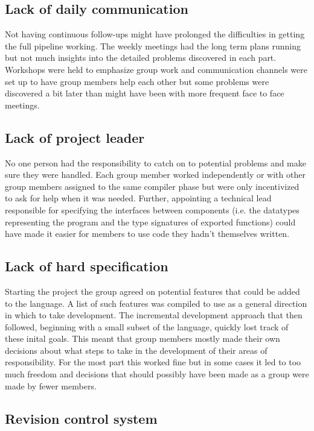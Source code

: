 \subsection{Lack of daily communication}

Not having continuous follow-ups might have prolonged the difficulties in getting the full pipeline working. The weekly meetings had the long term plans running but not much insights into the detailed problems discovered in each part. Workshops were held to emphasize group work and communication channels were set up to have group members help each other but some problems were discovered a bit later than might have been with more frequent face to face meetings.

\subsection{Lack of project leader}

No one person had the responsibility to catch on to potential problems and make sure they were handled. Each group member worked independently or with other group members assigned to the same compiler phase but were only incentivized to ask for help when it was needed. Further, appointing a technical lead responsible for specifying the interfaces between components (i.e. the datatypes representing the program and the type signatures of exported functions) could have made it easier for members to use code they hadn’t themselves written.

\subsection{Lack of hard specification}

Starting the project the group agreed on potential features that could be added to the language. A list of such features was compiled to use as a general direction in which to take development. The incremental development approach that then followed, beginning with a small subset of the language, quickly lost track of these inital goals. This meant that group members mostly made their own decisions about what steps to take in the development of their areas of responsibility. For the most part this worked fine but in some cases it led to too much freedom and decisions that should possibly have been made as a group were made by fewer members.

\subsection{Revision control system}

